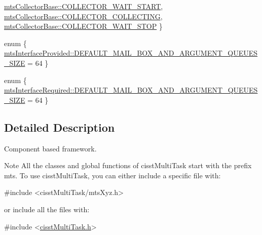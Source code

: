 \begin{DoxyCompactItemize}
\hyperlink{group__cisst_multi_task_ggadfbc058665584a56933a7997229c1fb6a67657229ff967c447ed3289c730bdf11}{mts\+Collector\+Base\+::\+C\+O\+L\+L\+E\+C\+T\+O\+R\+\_\+\+W\+A\+I\+T\+\_\+\+S\+T\+A\+R\+T}, 
\hyperlink{group__cisst_multi_task_ggadfbc058665584a56933a7997229c1fb6a9162148874993d7a2bf7a40bd5b1ad24}{mts\+Collector\+Base\+::\+C\+O\+L\+L\+E\+C\+T\+O\+R\+\_\+\+C\+O\+L\+L\+E\+C\+T\+I\+N\+G}, 
\hyperlink{group__cisst_multi_task_ggadfbc058665584a56933a7997229c1fb6a84e8e4233359e044e0f7db8ddc04f8c5}{mts\+Collector\+Base\+::\+C\+O\+L\+L\+E\+C\+T\+O\+R\+\_\+\+W\+A\+I\+T\+\_\+\+S\+T\+O\+P}
 \}
\item 
enum \{ \hyperlink{group__cisst_multi_task_gga5222914a51d6c1bf4a428c6b15f31598a33b84c3e16f4aac5a431ebd0f1aa848f}{mts\+Interface\+Provided\+::\+D\+E\+F\+A\+U\+L\+T\+\_\+\+M\+A\+I\+L\+\_\+\+B\+O\+X\+\_\+\+A\+N\+D\+\_\+\+A\+R\+G\+U\+M\+E\+N\+T\+\_\+\+Q\+U\+E\+U\+E\+S\+\_\+\+S\+I\+Z\+E} = 64
 \}
\item 
enum \{ \hyperlink{group__cisst_multi_task_gga3dd7af6f4cd328e3d23d080ad9f8bbb1a8b550bffbc9fcc1c50e42b45d36eaaec}{mts\+Interface\+Required\+::\+D\+E\+F\+A\+U\+L\+T\+\_\+\+M\+A\+I\+L\+\_\+\+B\+O\+X\+\_\+\+A\+N\+D\+\_\+\+A\+R\+G\+U\+M\+E\+N\+T\+\_\+\+Q\+U\+E\+U\+E\+S\+\_\+\+S\+I\+Z\+E} = 64
 \}
\end{DoxyCompactItemize}


\subsection{Detailed Description}
Component based framework.

\begin{DoxyNote}{Note}
All the classes and global functions of cisst\+Multi\+Task start with the prefix mts. To use cisst\+Multi\+Task, you can either include a specific file with\+: 
\begin{DoxyCode}
\textcolor{preprocessor}{#include <cisstMultiTask/mtsXyz.h>}
\end{DoxyCode}
 or include all the files with\+: 
\begin{DoxyCode}
\textcolor{preprocessor}{#include <\hyperlink{cisst_multi_task_8h}{cisstMultiTask.h}>}
\end{DoxyCode}
 
\end{DoxyNote}


